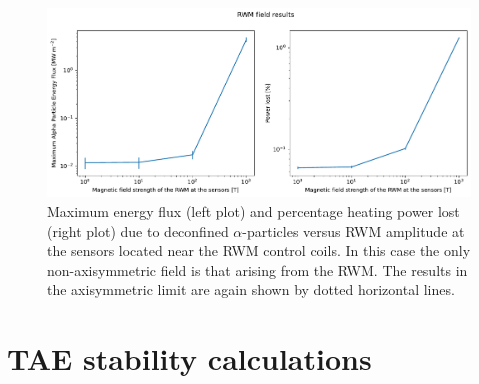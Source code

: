 \documentclass[10pt, a4paper, twoside]{article}
\begin{document}
\begin{figure}[htpb]
    \centering
    \includegraphics[width=0.99\linewidth]{Figures/max_and_total_flux_vs_bscale.pdf}
    \caption{Maximum energy flux (left plot) and percentage heating power lost (right plot) due to deconfined $\alpha$-particles versus RWM amplitude at the sensors located near the RWM control coils. In this case the only non-axisymmetric field is that arising from the RWM. The results in the axisymmetric limit are again shown by dotted horizontal lines.}
    \label{fig:max_and_total_flux_vs_bscale_rwm}
\end{figure}


\section{TAE stability calculations}
\label{sec:halo_work}
\end{document}

